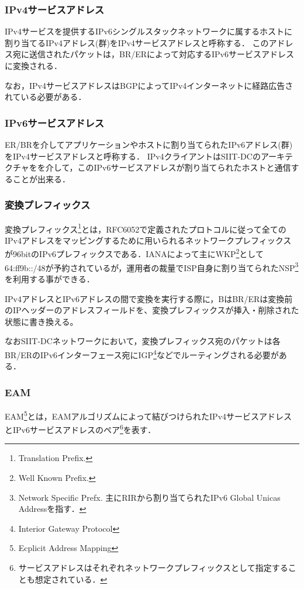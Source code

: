 \subsubsection{IPv4サービスアドレス}
IPv4サービスを提供するIPv6シングルスタックネットワークに属するホストに割り当てるIPv4アドレス(群)をIPv4サービスアドレスと呼称する．
このアドレス宛に送信されたパケットは，BR/ERによって対応するIPv6サービスアドレスに変換される．

なお，IPv4サービスアドレスはBGP\cite{RFC4271}によってIPv4インターネットに経路広告されている必要がある．

\subsubsection{IPv6サービスアドレス}
ER/BRを介してアプリケーションやホストに割り当てられたIPv6アドレス(群)をIPv4サービスアドレスと呼称する．
IPv4クライアントはSIIT-DCのアーキテクチャをを介して，このIPv6サービスアドレスが割り当てられたホストと通信することが出来る．

\subsubsection{変換プレフィックス}
\label{issue:siit-dc:translation-prefix}
 
変換プレフィックス\footnote{Translation Prefix.}とは，RFC6052\cite{RFC6052}で定義されたプロトコルに従って全てのIPv4アドレスをマッピングするために用いられるネットワークプレフィックスが96bitのIPv6プレフィックスである．IANAによって主にWKP\footnote{Well Known Prefix. }として64:ff9b::/48が予約\cite{RFC8215,IANA_allocation_v6}されているが，運用者の裁量でISP自身に割り当てられたNSP\footnote{Network Specific Prefx. 主にRIRから割り当てられたIPv6 Global Unicas Addressを指す．}を利用する事ができる．

IPv4アドレスとIPv6アドレスの間で変換を実行する際に，BはBR/ERは変換前のIPヘッダーのアドレスフィールドを、変換プレフィックスが挿入・削除された状態に書き換える。

なおSIIT-DCネットワークにおいて，変換プレフィックス宛のパケットは各BR/ERのIPv6インターフェース宛にIGP\footnote{Interior Gateway Protocol}などでルーティングされる必要がある．

\subsubsection{EAM}
EAM\footnote{Ecplicit Address Mapping}とは，EAMアルゴリズム\cite{RFC7757}によって結びつけられたIPv4サービスアドレスとIPv6サービスアドレスのペア\footnote{サービスアドレスはそれぞれネットワークプレフィックスとして指定することも想定されている．}を表す．

